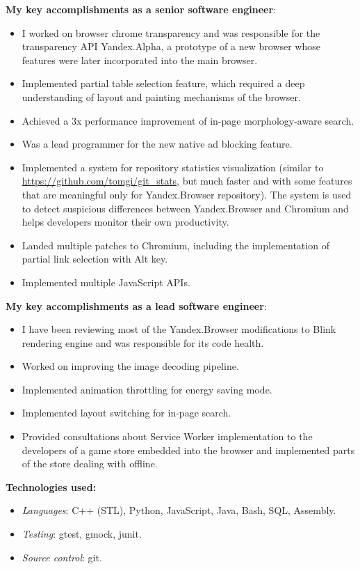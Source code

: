 \documentclass[11pt,a4paper]{moderncv}
\begin{document}
  \medskip
  \textbf{My key accomplishments as a senior software engineer}:
  \smallskip
  \begin{itemize}%
    \item I worked on browser chrome transparency and was responsible for the transparency API Yandex.Alpha, a prototype of a new browser whose features were later incorporated into the main browser.
    \item Implemented partial table selection feature, which required a deep understanding of layout and painting mechanisms of the browser.
    \item Achieved a 3x performance improvement of in-page morphology-aware search.
    \item Was a lead programmer for the new native ad blocking feature.
    \item Implemented a system for repository statistics visualization (similar to \url{https://github.com/tomgi/git\_stats}, but much faster and with some features that are meaningful only for Yandex.Browser repository).
      The system is used to detect suspicious differences between Yandex.Browser and Chromium and helps developers monitor their own productivity.
    \item Landed multiple patches to Chromium, including the implementation of partial link selection with Alt key.
    \item Implemented multiple JavaScript APIs.
  \end{itemize}

  \medskip
  \textbf{My key accomplishments as a lead software engineer}:
  \smallskip
  \begin{itemize}%
    \item I have been reviewing most of the Yandex.Browser modifications to Blink rendering engine and was responsible for its code health.
    \item Worked on improving the image decoding pipeline.
    \item Implemented animation throttling for energy saving mode.
    \item Implemented layout switching for in-page search.
    \item Provided consultations about Service Worker implementation to the developers of a game store embedded into the browser and implemented parts of the store dealing with offline.
  \end{itemize}

  \medskip
  \textbf{Technologies used:}
  \smallskip
  \begin{itemize}
    \item \textit{Languages}: C++ (STL), Python, JavaScript, Java, Bash, SQL, Assembly.
    \item \textit{Testing}: gtest, gmock, junit.
    \item \textit{Source control}: git.
  \end{itemize}
\end{document}
